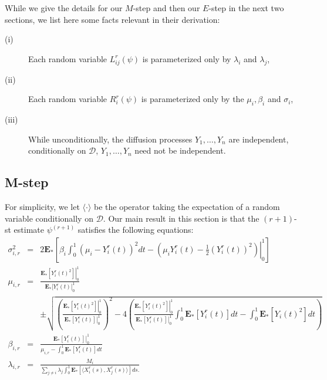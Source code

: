 \documentclass[12pt]{article}%
\begin{document}
While we give the details for our $M$-step and then our $E$-step in the next two sections, 
we list here some facts relevant in their derivation:
\begin{description}
\item[(i)] Each random variable $L_{ij}^r(\psi)$ is parameterized only by $\lambda_i$ and $\lambda_j$, 
\item[(ii)] Each random variable $R_{i}^r(\psi)$ is parameterized only by the $\mu_i, \beta_i$ and $\sigma_i$,
\item[(iii)] While unconditionally, the diffusion processes $Y_1,\ldots, Y_n$ are independent,
conditionally on $\mathcal D$, $Y_1,\ldots,Y_n$ need not be independent.
\end{description}

\subsection{M-step}
For simplicity, we let $\langle \cdot \rangle$ be the operator taking the expectation of a random 
variable conditionally on $\mathcal D$.
Our main result in this section is that 
the $(r+1)$-st estimate $\psi^{(r+1)}$ satisfies the following equations:
\begin{eqnarray*}
\sigma_{i,r}^2 &=& 2 \mathbf E_*\left[ \beta_i \int_0^1 \left(\mu_i - Y_i^r(t)\right)^2dt 
- \left(\left.\mu_i Y_i^r(t) - \frac{1}{2} (Y_i^r(t))^2\right)\right|_0^1\right]\\\mu_{i,r} 
&=&  \frac{\left. \mathbf E_*[Y_i^r(t)^2]\right|_0^1}{\left.\mathbf E_*[Y_i^r(t)\right|_0^1}\\ 
&\ &\pm
\sqrt{
\left(\frac{\left.\mathbf E_*[Y_i^r(t)^2]\right|_0^1}{\left.\mathbf E_*[Y_i^r(t)]\right|_0^1}\right)^2 
-
4\left( \frac{\left.\mathbf E_*[Y_i^r(t)^2]\right|_0^1}{\left.\mathbf E_*[Y_i^r(t)]\right|_0^1} \int_0^1\mathbf E_*[Y_i^r(t)]dt - \int_0^1 \mathbf E_*[Y_i(t)^2] dt\right)}\\
\beta_{i,r}
&=&
\frac{\left. \mathbf E_*[Y_i^r(t)] \right|_0^1}{\mu_{i,r} - \int_0^1 \mathbf E_*[Y_i^r(t)]dt}\\
\lambda_{i,r} 
&=& 
\frac{M_i}
{
\sum_{j\neq i} \lambda_j \int_0^1 \mathbf E_*[\langle X_i^r(s), X_j^r(s)\rangle] ds.
} 
\end{eqnarray*}
\end{document}
